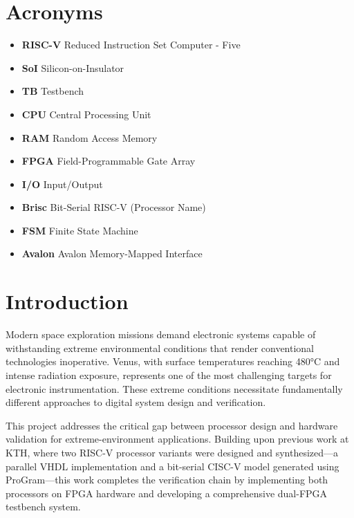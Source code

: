 \documentclass[12pt]{article}
\begin{document}
\section*{Acronyms}

\begin{itemize}
    \item \textbf{RISC-V} Reduced Instruction Set Computer - Five
    \item \textbf{SoI} Silicon-on-Insulator
    \item \textbf{TB} Testbench
    \item \textbf{CPU} Central Processing Unit
    \item \textbf{RAM} Random Access Memory
    \item \textbf{FPGA} Field-Programmable Gate Array
    \item \textbf{I/O} Input/Output
    \item \textbf{Brisc} Bit-Serial RISC-V (Processor Name)
    \item \textbf{FSM} Finite State Machine
    \item \textbf{Avalon} Avalon Memory-Mapped Interface
\end{itemize}

\newpage

\listoffigures
\newpage

\listoftables
\newpage


\section{Introduction}

Modern space exploration missions demand electronic systems capable of withstanding extreme environmental conditions that render conventional technologies inoperative. Venus, with surface temperatures reaching 480°C and intense radiation exposure, represents one of the most challenging targets for electronic instrumentation. These extreme conditions necessitate fundamentally different approaches to digital system design and verification.

This project addresses the critical gap between processor design and hardware validation for extreme-environment applications. Building upon previous work at KTH, where two RISC-V processor variants were designed and synthesized—a parallel VHDL implementation and a bit-serial CISC-V model generated using ProGram—this work completes the verification chain by implementing both processors on FPGA hardware and developing a comprehensive dual-FPGA testbench system.
\end{document}
